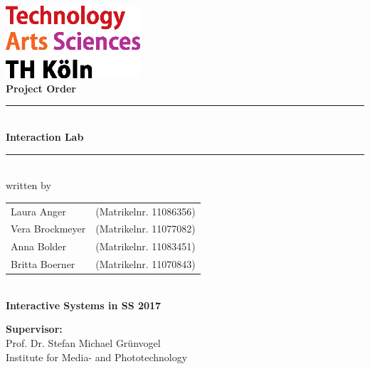 \thispagestyle{empty}
\begin{center}
	\includegraphics[width=5cm]{Bilder/logo_TH}\\[12ex]
	{\Huge\textbf{Project Order}}\\[8ex]
	\rule{.8\textwidth}{.2pt}
	{\Large\\[1ex] \textbf{Interaction Lab}}\\
	\rule{.8\textwidth}{.2pt}\\[10ex]
	written by\\[2ex]
	\begin{tabular}{ll}
		Laura Anger &(Matrikelnr. 11086356)\\ 
		Vera Brockmeyer &(Matrikelnr. 11077082)\\
		Anna Bolder &(Matrikelnr. 11083451)\\
		Britta Boerner &(Matrikelnr. 11070843)\\
	\end{tabular}\\[10ex]
	\textbf{Interactive Systems in SS 2017}\\			
\end{center}
\vfill
\begin{flushleft}
	{\bf Supervisor:}\\
	Prof. Dr. Stefan Michael Grünvogel\\
	Institute for Media- and Phototechnology
\end{flushleft}
\newpage